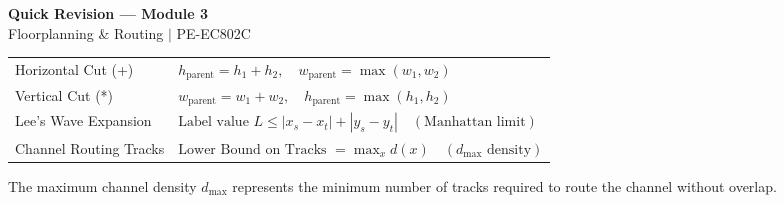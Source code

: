\documentclass[12pt,a4paper]{article}
\renewcommand{\arraystretch}{1.45}
\begin{document}
\newpage

\begin{center}
  {\large\bfseries\color{myred} Quick Revision — Module 3}\\[3pt]
  {\small\color{mydark} Floorplanning \& Routing $|$ PE-EC802C}
\end{center}
\noindent{\color{myred}\rule{\linewidth}{1.2pt}}
\vspace{8pt}

\begin{tcolorbox}[formulabox, title={\textbf{Key Formulas and Metrics at a Glance}}]
\renewcommand{\arraystretch}{1.35}
\begin{tabularx}{\linewidth}{B{5.0cm} X}
  Horizontal Cut (+) & $h_{\text{parent}} = h_1 + h_2, \quad w_{\text{parent}} = \max(w_1, w_2)$ \\[4pt]
  Vertical Cut (*) & $w_{\text{parent}} = w_1 + w_2, \quad h_{\text{parent}} = \max(h_1, h_2)$ \\[4pt]
  Lee's Wave Expansion & $\text{Label value } L \le |x_s - x_t| + |y_s - y_t| \quad (\text{Manhattan limit})$ \\[4pt]
  Channel Routing Tracks & $\text{Lower Bound on Tracks } = \max_x d(x) \quad (d_{\max} \text{ density})$
\end{tabularx}
\tcblower
The maximum channel density $d_{\max}$ represents the minimum number of tracks required to route the channel without overlap.
\end{tcolorbox}

\vspace{6pt}
\end{document}
